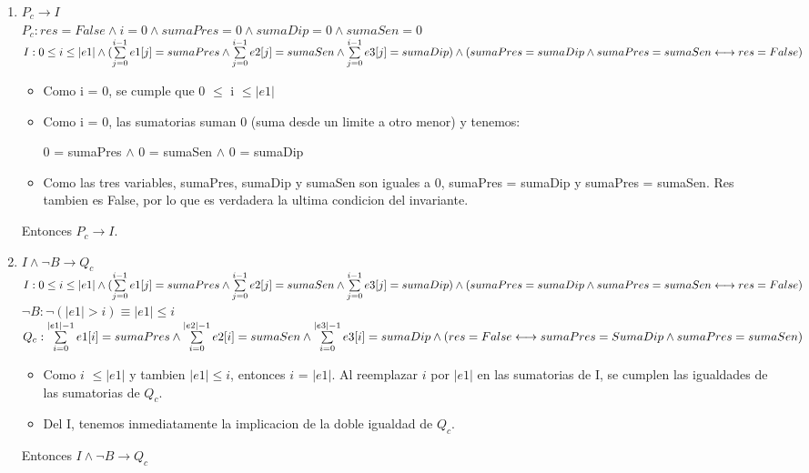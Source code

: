 \documentclass[10pt,a4paper]{article}
\begin{document}
\begin{enumerate}
\begin{enumerate}
    \item $P_c \longrightarrow I$ \\
    $P_c : res=False \land i=0 \land sumaPres=0 \land sumaDip=0 \land sumaSen=0$ \\
    $I : 0 \leq i \leq |e1| \land (\sum\limits_{j=0}^{i - 1} e1[j] = sumaPres \land \sum\limits_{j=0}^{i - 1} e2[j] = sumaSen \land \sum\limits_{j=0}^{i - 1} e3[j] = sumaDip) \land \\
    (sumaPres = sumaDip  \land sumaPres = sumaSen \longleftrightarrow res = False) 
    $
    \begin{itemize}
        \item Como i = 0, se cumple que 0 $\leq$ i $\leq |e1|$
        \item Como i = 0, las sumatorias suman 0 (suma desde un limite a otro menor) y tenemos:
        \begin{center}
            0 = sumaPres $\land$ 0 = sumaSen $\land$ 0 = sumaDip 
        \end{center}
        \item Como las tres variables, sumaPres, sumaDip y sumaSen son iguales a 0, sumaPres = sumaDip y sumaPres = sumaSen. Res tambien es False, por lo que es verdadera la ultima condicion del invariante.
    \end{itemize}
    Entonces $P_c \longrightarrow I$.
    
    
    \item $I \land \neg{B} \longrightarrow Q_c$ \\
    
    $I : 0 \leq i \leq |e1| \land (\sum\limits_{j=0}^{i - 1} e1[j] = sumaPres \land \sum\limits_{j=0}^{i - 1} e2[j] = sumaSen \land
    \sum\limits_{j=0}^{i - 1} e3[j] = sumaDip) \land \\
    (sumaPres = sumaDip  \land sumaPres = sumaSen \longleftrightarrow res = False)$ \\
    
    $\neg{B} : \neg{(|e1| > i)} \equiv |e1| \leq i $ \\
    $Q_c :  \sum\limits_{i=0}^{|e1| - 1} e1[i] = sumaPres \land \sum\limits_{i=0}^{|e2| - 1} e2[i] = sumaSen \land \sum\limits_{i=0}^{|e3| - 1} e3[i] = sumaDip \land \\ 
 (res = False \longleftrightarrow sumaPres = SumaDip \land sumaPres = sumaSen)$
 \begin{itemize}
     \item Como $i$ $\leq |e1|$ y tambien $|e1| \leq i$, entonces $i$ = $|e1|$. Al reemplazar $i$ por $|e1|$ en las sumatorias de I, se cumplen las igualdades de las sumatorias de $Q_c$.
     \item Del I, tenemos inmediatamente la implicacion de la doble igualdad de $Q_c$.
 \end{itemize}
 Entonces $I \land \neg{B} \longrightarrow Q_c$
    

\end{enumerate}
\end{enumerate}
\end{document}

